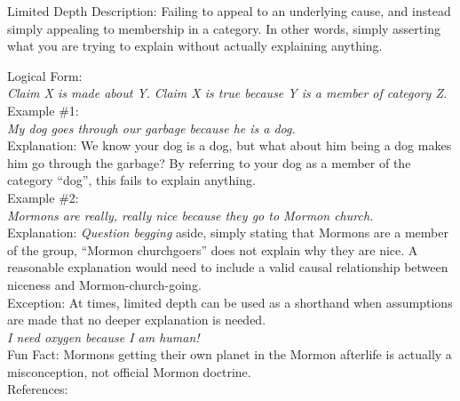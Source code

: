 \documentclass[a4paper,12pt,single,pdftex]{scrartcl}
\begin{document}
  

Limited Depth
    Description: Failing to appeal to an underlying cause, and instead simply appealing to membership in a category.  In other words, simply asserting what you are trying to explain without actually explaining anything.

    
      Logical Form:
    \\

    
      {\em Claim X is made about Y.} \newline
{\em Claim X is true because Y is a member of category Z.}
    \\

    
      Example \#1:
    \\

    
      {\em My dog goes through our garbage because he is a dog.}
    \\

    
      Explanation: We know your dog is a dog, but what about him being a dog makes him go through the garbage?  By referring to your dog as a member of the category “dog”, this fails to explain anything.
    \\

    
      Example \#2:
    \\

    
      {\em Mormons are really, really nice because they go to Mormon church.}
    \\

    
      Explanation: {\it Question begging} aside, simply stating that Mormons are a member of the group, “Mormon churchgoers” does not explain why they are nice.  A reasonable explanation would need to include a valid causal relationship between niceness and Mormon-church-going.
    \\

    
      Exception: At times, limited depth can be used as a shorthand when assumptions are made that no deeper explanation is needed. 
    \\

    
      {\em I need oxygen because I am human!}
    \\

    
      Fun Fact: Mormons getting their own planet in the Mormon afterlife is actually a misconception, not official Mormon doctrine.
    \\

    References:

    
      
        
      \\
\end{document}
